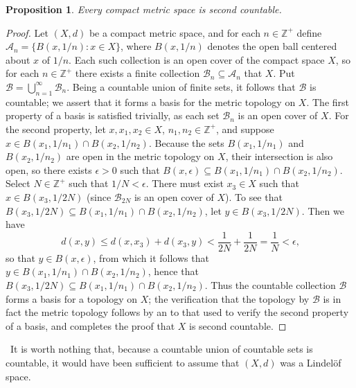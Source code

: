 \documentclass[12pt]{article}
\theoremstyle{plain}
\newtheorem*{proposition*}{Proposition}
\begin{document}
\begin{proposition*}
Every compact metric space is second countable.
\end{proposition*}
\begin{proof}
Let $(X,d)$ be a compact metric space, and for each $n\in\mathbb{Z}^+$ define $\mathcal{A}_n=\{B(x,1/n):x\in X\}$, where $B(x,1/n)$ denotes the open ball centered about $x$ of  $1/n$. Each such collection is an open cover of the compact space $X$, so for each $n\in\mathbb{Z}^+$ there exists a finite collection $\mathcal{B}_n\subseteq\mathcal{A}_n$ that  $X$. Put $\mathcal{B}=\bigcup_{n=1}^\infty\mathcal{B}_n$. Being a countable union of finite sets, it follows that $\mathcal{B}$ is countable; we assert that it forms a basis for the metric topology on $X$. The first property of a basis is satisfied trivially, as each set $\mathcal{B}_n$ is an open cover of $X$. For the second property, let $x,x_1,x_2\in X$, $n_1,n_2\in\mathbb{Z}^+$, and suppose $x\in B(x_1,1/n_1)\cap B(x_2,1/n_2)$. Because the sets $B(x_1,1/n_1)$ and $B(x_2,1/n_2)$ are open in the metric topology on $X$, their intersection is also open, so there exists $\epsilon>0$ such that $B(x,\epsilon)\subseteq B(x_1,1/n_1)\cap B(x_2,1/n_2)$. Select $N\in\mathbb{Z}^+$ such that $1/N<\epsilon$. There must exist $x_3\in X$ such that $x\in B(x_3,1/2N)$ (since $\mathcal{B}_{2N}$ is an open cover of $X$). To see that $B(x_3,1/2N)\subseteq B(x_1,1/n_1)\cap B(x_2,1/n_2)$, let $y\in B(x_3,1/2N)$. Then we have
\begin{equation}
d(x,y)\leq d(x,x_3)+d(x_3,y)<\dfrac{1}{2N}+\dfrac{1}{2N}=\dfrac{1}{N}<\epsilon\text{,}
\end{equation} 
so that $y\in B(x,\epsilon)$, from which it follows that $y\in B(x_1,1/n_1)\cap B(x_2,1/n_2)$, hence that $B(x_3,1/2N)\subseteq B(x_1,1/n_1)\cap B(x_2,1/n_2)$. Thus the countable collection $\mathcal{B}$ forms a basis for a topology on $X$; the verification that the topology  by $\mathcal{B}$ is in fact the metric topology follows by an  to that used to verify the second property of a basis, and completes the proof that $X$ is second countable.
\end{proof}\
It is worth nothing that, because a countable union of countable sets is countable, it would have been sufficient to assume that $(X,d)$ was a Lindel\"{o}f space.
\end{document}
